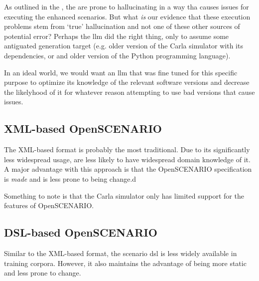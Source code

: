 As outlined in the , the  are prone to hallucinating in a way tha
causes issues for executing the enhanced scenarios. But what \emph{is} our evidence that these
execution problems stem from `true' hallucination and not one of these other sources of potential
error? Perhaps the \acrshort{llm} did the right thing, only to assume some antiguated generation
target (e.g. older version of the Carla simulator with its dependencies, or and older version of the
Python programming language).

In an ideal world, we would want an \acrshort{llm} that was fine tuned for this specific purpose to
optimize its knowledge of the relevant software versions and decrease the likelyhood of it for
whatever reason attempting to use bad versions that cause issues.

\subsection{XML-based OpenSCENARIO}

The XML-based format is probably the most traditional. Due to its significantly less widespread
usage,  are less likely to have widespread domain knowledge of it. A major advantage
with this approach is that the OpenSCENARIO specification is \emph{made} and is less prone to being
change.d

Something to note is that the Carla simulator only has limited support for the
features of OpenSCENARIO.

\subsection{DSL-based OpenSCENARIO}

Similar to the XML-based format, the scenario \acrshort{dsl} is less widely available in training corpora. However, it also maintains the advantage of being more static and less prone to change.


